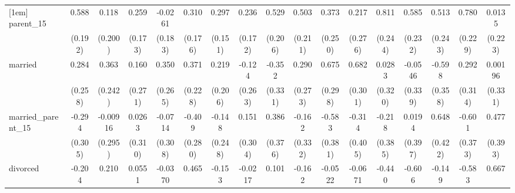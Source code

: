 {\begin{tabular}{l*{16}{c}}
[1em]
parent\_15           &       0.588\sym{**} &       0.118         &       0.259         &     -0.0261         &       0.310         &       0.297\sym{*}  &       0.236         &       0.529\sym{*}  &       0.503\sym{*}  &       0.373         &       0.217         &       0.811\sym{***}&       0.585\sym{*}  &       0.513\sym{*}  &       0.780\sym{***}&      0.0135         \\
                    &     (0.192)         &     (0.200)         &     (0.173)         &     (0.183)         &     (0.176)         &     (0.151)         &     (0.172)         &     (0.206)         &     (0.211)         &     (0.250)         &     (0.276)         &     (0.244)         &     (0.232)         &     (0.243)         &     (0.229)         &     (0.223)         \\
[1em]
married             &       0.284         &       0.363         &       0.160         &       0.350         &       0.371         &       0.219         &      -0.124         &      -0.352         &       0.290         &       0.675\sym{*}  &       0.682\sym{*}  &      0.0283         &     -0.0546         &      -0.598         &       0.292         &     0.00196         \\
                    &     (0.258)         &     (0.242)         &     (0.271)         &     (0.265)         &     (0.228)         &     (0.206)         &     (0.263)         &     (0.331)         &     (0.273)         &     (0.298)         &     (0.301)         &     (0.320)         &     (0.339)         &     (0.358)         &     (0.314)         &     (0.331)         \\
[1em]
married\_parent\_15   &      -0.294         &    -0.00916         &      0.0263         &     -0.0714         &      -0.409         &      -0.148         &       0.151         &       0.386         &      -0.162         &      -0.583         &      -0.314         &      -0.218         &      0.0194         &       0.648         &      -0.601         &       0.477         \\
                    &     (0.305)         &     (0.295)         &     (0.310)         &     (0.308)         &     (0.280)         &     (0.248)         &     (0.304)         &     (0.376)         &     (0.332)         &     (0.381)         &     (0.405)         &     (0.385)         &     (0.397)         &     (0.422)         &     (0.373)         &     (0.393)         \\
[1em]
divorced            &      -0.204         &       0.210         &      0.0551         &     -0.0370         &       0.465         &      -0.153         &     -0.0217         &       0.101         &      -0.162         &     -0.0522         &     -0.0671         &      -0.440         &      -0.606         &      -0.149         &      -0.583         &       0.667\sym{*}  \\

\end{tabular}}
